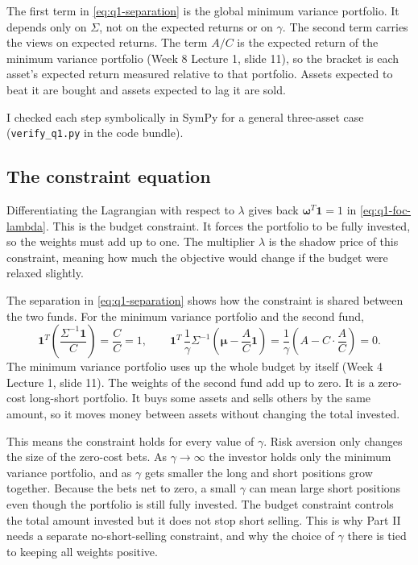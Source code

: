 \documentclass[11pt]{article}
\numberwithin{equation}{section}
\begin{document}
The first term in \eqref{eq:q1-separation} is the global minimum variance portfolio. It depends only on $\Sigma$, not on the expected returns or on $\gamma$. The second term carries the views on expected returns. The term $A/C$ is the expected return of the minimum variance portfolio (Week 8 Lecture 1, slide 11), so the bracket is each asset's expected return measured relative to that portfolio. Assets expected to beat it are bought and assets expected to lag it are sold.

I checked each step symbolically in SymPy for a general three-asset case (\texttt{verify\_q1.py} in the code bundle).

\subsection{The constraint equation}
\label{sec:q1-2}

Differentiating the Lagrangian with respect to $\lambda$ gives back $\bm{\omega}^{T}\mathbf{1} = 1$ in \eqref{eq:q1-foc-lambda}. This is the budget constraint. It forces the portfolio to be fully invested, so the weights must add up to one. The multiplier $\lambda$ is the shadow price of this constraint, meaning how much the objective would change if the budget were relaxed slightly.

The separation in \eqref{eq:q1-separation} shows how the constraint is shared between the two funds. For the minimum variance portfolio and the second fund,
\begin{equation*}
  \mathbf{1}^{T}\left(\frac{\Sigma^{-1}\mathbf{1}}{C}\right) = \frac{C}{C} = 1,
  \qquad
  \mathbf{1}^{T}\,\frac{1}{\gamma}\Sigma^{-1}\left(\bm{\mu} - \frac{A}{C}\mathbf{1}\right) = \frac{1}{\gamma}\left(A - C\cdot\frac{A}{C}\right) = 0.
\end{equation*}
The minimum variance portfolio uses up the whole budget by itself (Week 4 Lecture 1, slide 11). The weights of the second fund add up to zero. It is a zero-cost long-short portfolio. It buys some assets and sells others by the same amount, so it moves money between assets without changing the total invested.

This means the constraint holds for every value of $\gamma$. Risk aversion only changes the size of the zero-cost bets. As $\gamma \to \infty$ the investor holds only the minimum variance portfolio, and as $\gamma$ gets smaller the long and short positions grow together. Because the bets net to zero, a small $\gamma$ can mean large short positions even though the portfolio is still fully invested. The budget constraint controls the total amount invested but it does not stop short selling. This is why Part II needs a separate no-short-selling constraint, and why the choice of $\gamma$ there is tied to keeping all weights positive.
\end{document}
